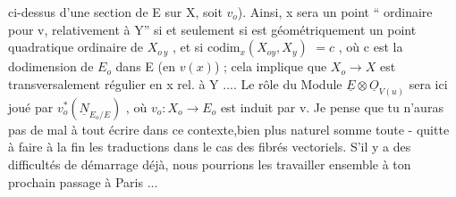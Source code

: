 ci-dessus d'une section de E sur X, soit $v_{o}$). Ainsi, x sera un point
``  ordinaire pour v, relativement à Y'' si et seulement si   est
géométriquement un point quadratique ordinaire de $X_{o\,y}$ , et si $\mathrm{codim}_{x}(X_{oy},X_{y})$
$= c$ , où c est la dodimension de $E_{o}$ dans E (en $v(x)$) ; cela implique que
$X_{o}\longrightarrow X$ est  transversalement régulier en x rel. à Y .... Le rôle du Module
$\underline{E}\otimes\underline{O}_{V(u)}$ sera ici joué par $v_{o}^{*}(\underline{N}_{E_{o}/E})$ , où $v_{o}:X_{o}\longrightarrow E_{o}$ est induit par v. Je
pense que tu n'auras pas de mal à tout écrire dans ce contexte,bien plus
naturel somme toute - quitte à faire à la fin les traductions dans le cas
des fibrés vectoriels. S'il y a des difficultés de démarrage déjà, nous
pourrions les travailler ensemble à ton prochain passage à Paris ... 
